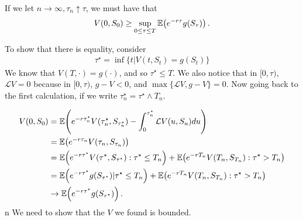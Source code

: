 If we let $n \rightarrow \infty, \tau_{n} \uparrow \tau$, we must have that
\begin{align}
  \label{eq:138}
  V(0, S_{0}) \geq \sup_{0 \leq \tau \leq T} \E{e^{-r \tau} g(S_{\tau})}.
\end{align}

To show that there is equality, consider
\begin{align}
  \label{eq:139}
  \tau^{\star} = \inf \{ t | V(t, S_{t}) = g(S_{t}) \}
\end{align}
We know that $V(T, \cdot) = g(\cdot)$, and so $\tau^{\star} \leq T$.
We also notice that in $[0, \tau)$, $\mathcal{L} V = 0$ because in
$[0, \tau)$, $g - V < 0$, and $\max \{ \mathcal{L} V, g - V \} = 0$.
Now going back to the first calculation, if we write $\tau^{\star}_{n}
= \tau^{\star} \wedge T_{n}$.

\begin{align}
  \label{eq:137}
  V(0, S_{0}) &= \E{e^{-r \tau^{\star}_{n}} V(\tau^{\star}_{n}, S_{\tau^{\star}_{n}}) -
    \int_{0}^{\tau^{\star}_{n}} \mathcal{L} V(u, S_{u}) du} \\
  &= \E{e^{-r \tau_{n}} V(\tau_{n}, S_{\tau_{n}})} \\
  &= \E{e^{-r\tau^{\star}} V(\tau^{\star}, S_{\tau^{\star}}) :
    \tau^{\star} \leq T_{n}} + \E{e^{-r T_{n}} V(T_{n}, S_{T_{n}}):
    \tau^{\star} > T_{n}} \\
  &= \E{e^{-r \tau^{\star}} g(S_{\tau^{\star}}) | \tau^{\star} \leq
    T_{n} } + \E{e^{-r T_{n}} V(T_{n}, S_{T_{n}}): \tau^{\star} >
    T_{n}} \\
  &\rightarrow \E{e^{-r \tau^{\star}} g(S_{\tau^{\star}})}.
\end{align} 
n
We need to show that the $V$ we found is bounded.

